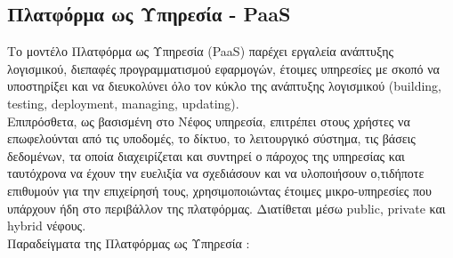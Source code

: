 \documentclass{article}
\begin{document}
\subsection{Πλατφόρμα ως Υπηρεσία -
PaaS}
Το μοντέλο Πλατφόρμα ως Υπηρεσία
(PaaS) παρέχει εργαλεία
ανάπτυξης λογισμικού, διεπαφές προγραμματισμού εφαρμογών, έτοιμες
υπηρεσίες με σκοπό να υποστηρίξει και να διευκολύνει όλο τον κύκλο της
ανάπτυξης λογισμικού (building, testing,
deployment, managing, updating). \\
Επιπρόσθετα, ως βασισμένη στο Νέφος υπηρεσία, επιτρέπει στους χρήστες να
επωφελούνται από τις υποδομές, το δίκτυο, το λειτουργικό σύστημα, τις
βάσεις δεδομένων, τα οποία διαχειρίζεται και συντηρεί ο πάροχος της
υπηρεσίας και ταυτόχρονα να έχουν την ευελιξία να σχεδιάσουν και να
υλοποιήσουν ο,τιδήποτε επιθυμούν για την επιχείρησή τους, χρησιμοποιώντας
έτοιμες μικρο-υπηρεσίες που υπάρχουν ήδη στο περιβάλλον της πλατφόρμας.
Διατίθεται μέσω  public, private
και
hybrid νέφους. \\
Παραδείγματα της Πλατφόρμας ως Υπηρεσία :
\end{document}
